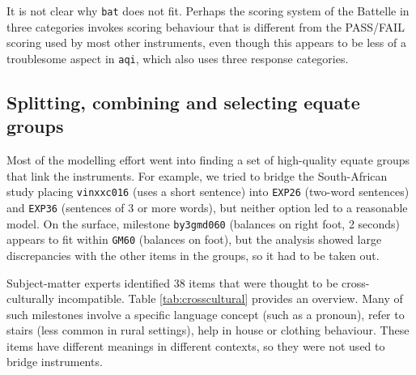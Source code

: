 \documentclass[
]{book}
\begin{document}
It is not clear why \texttt{bat} does not fit. Perhaps the scoring system of the Battelle in three categories invokes scoring behaviour that is different from the PASS/FAIL scoring used by most other instruments, even though this appears to be less of a troublesome aspect in \texttt{aqi}, which also uses three response categories.

\hypertarget{splitting-combining-and-selecting-equate-groups}{%
\subsection{Splitting, combining and selecting equate groups}\label{splitting-combining-and-selecting-equate-groups}}

Most of the modelling effort went into finding a set of high-quality equate groups that link the instruments. For example, we tried to bridge the South-African study placing \texttt{vinxxc016} (uses a short sentence) into \texttt{EXP26} (two-word sentences) and \texttt{EXP36} (sentences of 3 or more words), but neither option led to a reasonable model. On the surface, milestone \texttt{by3gmd060} (balances on right foot, 2 seconds) appears to fit within \texttt{GM60} (balances on foot), but the analysis showed large discrepancies with the other items in the groups, so it had to be taken out.

Subject-matter experts identified 38 items that were thought to be cross-culturally incompatible. Table \ref{tab:crosscultural} provides an overview. Many of such milestones involve a specific language concept (such as a pronoun), refer to stairs (less common in rural settings), help in house or clothing behaviour. These items have different meanings in different contexts, so they were not used to bridge instruments.
\end{document}
